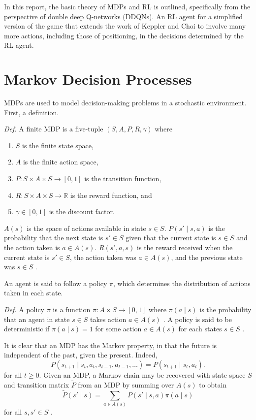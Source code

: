 \documentclass[final,5p,times,twocolumn]{elsarticle}
\begin{document}
In this report, the basic theory of MDPs and RL is outlined, specifically from the perspective of double deep Q-networks (DDQNs). An RL agent for a simplified version of the game that extends the work of Keppler and Choi to involve many more actions, including those of positioning, in the decisions determined by the RL agent.

\section{Markov Decision Processes}
\label{sec:mdp}

MDPs are used to model decision-making problems in a stochastic environment. First, a definition.

\textit{Def.} A finite MDP is a five-tuple $(S, A, P, R, \gamma)$ where
\begin{enumerate}
    \item $S$ is the finite state space,
    \item $A$ is the finite action space,
    \item $P: S \times A \times S \to [0, 1]$ is the transition function,
    \item $R: S \times A \times S \to \mathbb{R}$ is the reward function, and 
    \item $\gamma \in [0, 1]$ is the discount factor.
\end{enumerate}
$A(s)$ is the space of actions available in state $s \in S$. $P(s' \mid s, a)$ is the probability that the next state is $s' \in S$ given that the current state is $s \in S$ and the action taken is $a \in A(s)$. $R(s', a, s)$ is the reward received when the current state is $s' \in S$, the action taken was $a \in A(s)$, and the previous state was $s \in S$ \cite{sutton1998reinforcement}.

An agent is said to follow a policy $\pi$, which determines the distribution of actions taken in each state.

\textit{Def.} A policy $\pi$ is a function $\pi: A \times S \to [0, 1]$ where $\pi(a \mid s)$ is the probability that an agent in state $s \in S$ takes action $a \in A(s)$ \cite{puterman2014markov}. A policy is said to be deterministic if $\pi(a \mid s) = 1$ for some action $a \in A(s)$ for each states $s \in S$ \cite{sutton1998reinforcement}.

It is clear that an MDP has the Markov property, in that the future is independent of the past, given the present. Indeed,
$$P(s_{t+1} \mid s_t, a_t, s_{t-1}, a_{t-1}, \ldots) = P(s_{t+1} \mid s_t, a_t).$$
for all $t \geq 0$. Given an MDP, a Markov chain may be recovered with state space $S$ and transition matrix $\tilde{P}$ from an MDP by summing over $A(s)$ to obtain
$$\tilde{P}(s' \mid s) = \sum_{a \in A(s)} P(s' \mid s, a) \pi(a \mid s)$$
for all $s, s' \in S$ \cite{sutton1998reinforcement}.
\end{document}
